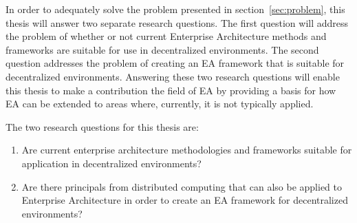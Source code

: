 In order to adequately solve the problem presented in section~\ref{sec:problem}, this thesis will answer two separate research questions. The first question will address the problem of whether or not current Enterprise Architecture methods and frameworks are suitable for use in decentralized environments. The second question addresses the problem of creating an EA framework that is suitable for decentralized environments. Answering these two research questions will enable this thesis to make a contribution the field of EA by providing a basis for how EA can be extended to areas where, currently, it is not typically applied. 

The two research questions for this thesis are:

\begin{enumerate}
\item Are current enterprise architecture methodologies and frameworks suitable for application in decentralized environments?
\label{req:1}
\item Are there principals from distributed computing that can also be applied to Enterprise Architecture in order to create an EA framework for decentralized environments?
\label{req:2}
\end{enumerate}

